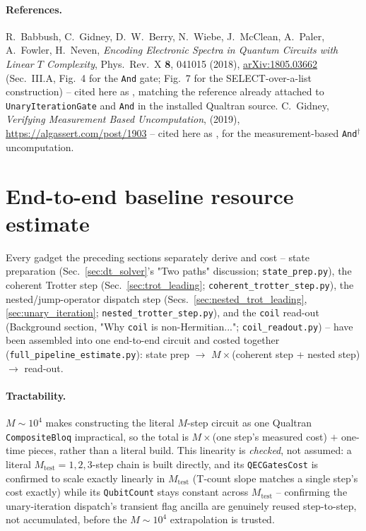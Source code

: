 \documentclass[11pt]{article}
\begin{document}
\paragraph{References.} R.~Babbush, C.~Gidney, D.~W.~Berry, N.~Wiebe, J.~McClean, A.~Paler, A.~Fowler, H.~Neven, \emph{Encoding Electronic Spectra in Quantum Circuits with Linear $T$ Complexity}, Phys.\ Rev.\ X \textbf{8}, 041015 (2018), \href{https://arxiv.org/abs/1805.03662}{arXiv:1805.03662} (Sec.~III.A, Fig.~4 for the \texttt{And} gate; Fig.~7 for the SELECT-over-a-list construction) -- cited here as \cite{Babbush2018}, matching the reference already attached to \texttt{UnaryIterationGate} and \texttt{And} in the installed Qualtran source. C.~Gidney, \emph{Verifying Measurement Based Uncomputation}, (2019), \href{https://algassert.com/post/1903}{https://algassert.com/post/1903} -- cited here as \cite{Gidney2019}, for the measurement-based \texttt{And}$^\dagger$ uncomputation.

\section{End-to-end baseline resource estimate}
\label{sec:full_pipeline}

Every gadget the preceding sections separately derive and cost -- state preparation (Sec.~\ref{sec:dt_solver}'s "Two paths" discussion; \texttt{state\_prep.py}), the coherent Trotter step (Sec.~\ref{sec:trot_leading}; \texttt{coherent\_trotter\_step.py}), the nested/jump-operator dispatch step (Secs.~\ref{sec:nested_trot_leading}, \ref{sec:unary_iteration}; \texttt{nested\_trotter\_step.py}), and the \texttt{coil} read-out (Background section, "Why \texttt{coil} is non-Hermitian..."; \texttt{coil\_readout.py}) -- have been assembled into one end-to-end circuit and costed together (\texttt{full\_pipeline\_estimate.py}): state prep $\to$ $M\times$(coherent step + nested step) $\to$ read-out.

\paragraph{Tractability.} $M\sim10^4$ makes constructing the literal $M$-step circuit as one Qualtran \texttt{CompositeBloq} impractical, so the total is $M\times$(one step's measured cost) $+$ one-time pieces, rather than a literal build. This linearity is \emph{checked}, not assumed: a literal $M_{\text{test}}=1,2,3$-step chain is built directly, and its \texttt{QECGatesCost} is confirmed to scale exactly linearly in $M_{\text{test}}$ (T-count slope matches a single step's cost exactly) while its \texttt{QubitCount} stays constant across $M_{\text{test}}$ -- confirming the unary-iteration dispatch's transient flag ancilla are genuinely reused step-to-step, not accumulated, before the $M\sim10^4$ extrapolation is trusted.
\end{document}
